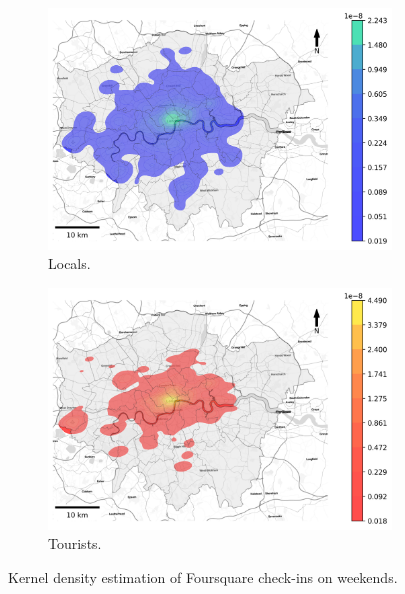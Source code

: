 \documentclass{article}
\theoremstyle{definition}
\theoremstyle{remark}
\begin{document}
\begin{figure}[!h]

\begin{subfigure}{0.5\textwidth}
\includegraphics[width=1\linewidth]{figures/kde_locals_weekend.png} 
\caption{Locals.}
\label{fig:kde_locals_weekend}
\end{subfigure}
\begin{subfigure}{0.5\textwidth}
\includegraphics[width=1\linewidth]{figures/kde_tourists_weekend.png}
\caption{Tourists.}
\label{fig:kde_tourists_weekend}
\end{subfigure}

\caption{Kernel density estimation of Foursquare check-ins on weekends.} \label{fig:kde_weekend}
\end{figure}


\end{document}

